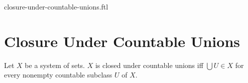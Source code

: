\documentclass{naproche-library}
\begin{document}
\begin{smodule}{closure-under-countable-unions.ftl}

  \section*{Closure Under Countable Unions}

  \begin{definition}[forthel,id=FOUNDATIONS_14_2377279311183872]
    Let $X$ be a system of sets.
    $X$ is closed under countable unions iff $\bigcup U \in X$ for every nonempty countable subclass $U$ of $ X$.
  \end{definition}
\end{smodule}
\end{document}
